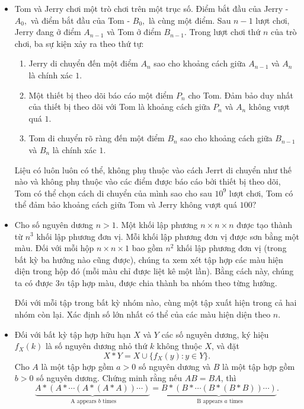 \documentclass[11pt]{scrartcl}
\begin{document}
\begin{itemize}[label=, leftmargin=0em, itemsep=-0em]
    \item \begin{btvn}
        Tom và Jerry chơi một trò chơi trên một trục số. Điểm bắt đầu của Jerry - $A_0,$ và điểm bắt đầu của Tom - $B_0,$ là cùng một điểm. Sau $n-1$ lượt chơi, Jerry đang ở điểm $A_{n-1}$ và Tom ở điểm $B_{n-1}.$ Trong lượt chơi thứ $n$ của trò chơi, ba sự kiện xảy ra theo thứ tự:
        \begin{enumerate}
            \item Jerry di chuyển đến một điểm $A_n$ sao cho khoảng cách giữa $A_{n-1}$ và $A_n$ là chính xác $1$.
            \item Một thiết bị theo dõi báo cáo một điểm $P_n$ cho Tom. Đảm bảo duy nhất của thiết bị theo dõi với Tom là khoảng cách giữa $P_n$ và $A_n$ không vượt quá $1$.
            \item Tom di chuyển rõ ràng đến một điểm $B_n$ sao cho khoảng cách giữa $B_{n-1}$ và $B_n$ là chính xác $1$.
        \end{enumerate}
        Liệu có luôn luôn có thể, không phụ thuộc vào cách Jerrt di chuyển như thế nào và không phụ thuộc vào các điểm được báo cáo bởi thiết bị theo dõi, Tom có thể chọn cách di chuyển của mình sao cho sau $10^9$ lượt chơi, Tom có thể đảm bảo khoảng cách giữa Tom và Jerry không vượt quá $100?$
    \end{btvn}

    \item \begin{btvn}
        Cho số nguyên dương $n > 1$. Một khối lập phương $n \times n \times n$ được tạo thành từ $n^3$ khối lập phương đơn vị. Mỗi khối lập phương đơn vị được sơn bằng một màu. Đối với mỗi hộp $n \times n \times 1$ bao gồm $n^2$ khối lập phương đơn vị (trong bất kỳ ba hướng nào cũng được), chúng ta xem xét tập hợp các màu hiện diện trong hộp đó (mỗi màu chỉ được liệt kê một lần). Bằng cách này, chúng ta có được $3n$ tập hợp màu, được chia thành ba nhóm theo từng hướng.

        Đối với mỗi tập trong bất kỳ nhóm nào, cùng một tập xuất hiện trong cả hai nhóm còn lại. Xác định số lớn nhất có thể của các màu hiện diện theo $n$.
    \end{btvn}

    \item \begin{btvn}
        Đối với bất kỳ tập hợp hữu hạn $X$ và $Y$ các số nguyên dương, ký hiệu $f_X(k)$ là số nguyên dương nhỏ thứ $k$ không thuộc $X$, và đặt 
        $$X*Y=X\cup \{ f_X(y):y\in Y\}.$$
        Cho $A$ là một tập hợp gồm $a>0$ số nguyên dương và $B$ là một tập hợp gồm $b>0$ số nguyên dương. Chứng minh rằng nếu $AB=BA$, thì
        $$\underbrace{A*(A*\cdots (A*(A*A))\cdots )}_{\text{ A appears $b$ times}}=\underbrace{B*(B*\cdots (B*(B*B))\cdots )}_{\text{ B appears $a$ times}}.$$  
    \end{btvn}


\end{itemize}
\end{document}
